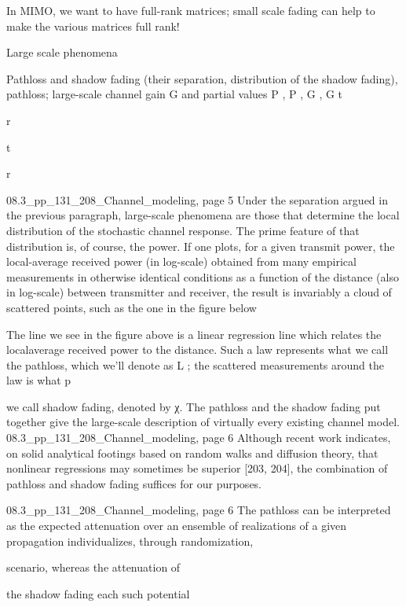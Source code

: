 {{{In MIMO, we want to have full-rank matrices; small scale fading can help to make the various matrices full rank!

Large scale phenomena

Pathloss and shadow fading (their separation, distribution of the shadow fading), pathloss; large-scale channel gain G and partial values P , P , G , G t

r

t

r

08.3_pp_131_208_Channel_modeling, page 5 Under the separation argued in the previous paragraph, large-scale phenomena are those that determine the local distribution of the stochastic channel response. The prime feature of that distribution is, of course, the power. If one plots, for a given transmit power, the local-average received power (in log-scale) obtained from many empirical measurements in otherwise identical conditions as a function of the distance (also in log-scale) between transmitter and receiver, the result is invariably a cloud of scattered points, such as the one in the figure below

The line we see in the figure above is a linear regression line which relates the localaverage received power to the distance. Such a law represents what we call the pathloss, which we'll denote as L ; the scattered measurements around the law is what p

we call shadow fading, denoted by χ.
The pathloss and the shadow fading put together give the large-scale description of virtually every existing channel model.
08.3_pp_131_208_Channel_modeling, page 6 Although recent work indicates, on solid analytical footings based on random walks and diffusion theory, that nonlinear regressions may sometimes be superior [203,
204], the combination of pathloss and shadow fading suffices for our purposes.

08.3_pp_131_208_Channel_modeling, page 6 The pathloss can be interpreted as the expected attenuation over an ensemble of realizations of a given propagation individualizes, through randomization,

scenario, whereas the attenuation of

the shadow fading each such potential

}}}
